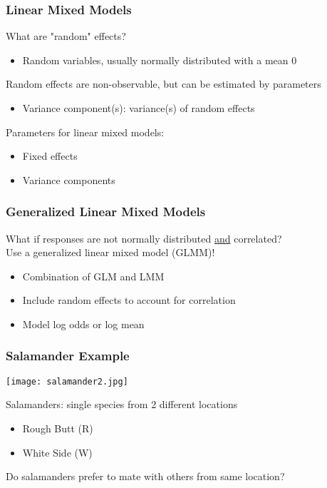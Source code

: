 \documentclass{beamer}
\begin{document}
\begin{frame}
\frametitle{Linear Mixed Models}

What are "random" effects?
\begin{itemize}
    \item[] Random variables, usually normally distributed with a mean 0
\end{itemize}
\vspace{.5cm}
Random effects are non-observable, but can be estimated by parameters
\begin{itemize}
    \item[] Variance component(s): variance(s) of random effects
\end{itemize}
\vspace{.5cm}
Parameters for linear mixed models:
\begin{itemize}
    \item Fixed effects
    \item Variance components
\end{itemize}

\end{frame}

\begin{frame}
\frametitle{Generalized Linear Mixed Models}

What if responses are not normally distributed \underline{and} correlated? \\
\vspace{.5cm}
Use a generalized linear mixed model (GLMM)!
\begin{itemize}
    \item Combination of GLM and LMM
    \item Include random effects to account for correlation
    \item Model log odds or log mean
\end{itemize}

\end{frame}

\begin{frame}
\frametitle{Salamander Example}

\begin{center}
\texttt{[image: salamander2.jpg]}
\end{center}

Salamanders: single species from 2 different locations
\begin{itemize}
    \item Rough Butt (R)
    \item White Side (W)
\end{itemize}
\vspace{.25cm}
Do salamanders prefer to mate with others from same location?

\end{frame}
\end{document}

